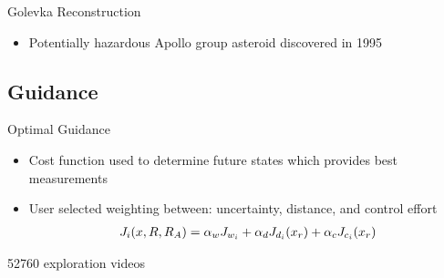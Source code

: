 \begin{frame}{Golevka Reconstruction}
    \begin{itemize}
        \item Potentially hazardous Apollo group asteroid discovered in 1995
    \end{itemize}
    \begin{center}
\end{center}
\end{frame}

\subsection{Guidance}
\begin{frame}{Optimal Guidance}
    \begin{itemize}
        \item Cost function used to determine future states which provides best measurements
        \item User selected weighting between: uncertainty, distance, and control effort
            \begin{align*}
                J_i (x, R, R_A) = \alpha_w J_{w_i} + \alpha_d J_{d_i}(x_r) + \alpha_c J_{c_i}(x_r)
            \end{align*}
    \end{itemize}

    52760 exploration videos
\end{frame}

